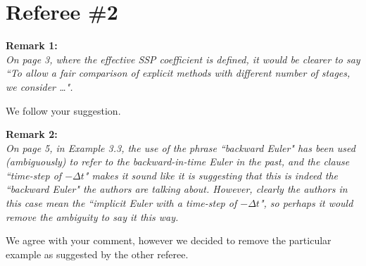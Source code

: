 \documentclass[12pt]{article}
\newcommand{\remark}[2]{\vspace{25pt} \noindent \textbf{Remark #1:\newline} \textit{#2}\vspace{15pt}}
\renewcommand{\newline}{\vspace{15pt}\\}
\begin{document}
\section*{Referee \#2}

\remark{1}{
On page 3, where the effective SSP coefficient is defined, it would be clearer to say
``To allow a fair comparison of explicit methods with different number of stages, we consider \dots". }

We follow your suggestion.

\remark{2}{
On page 5, in Example 3.3, the use of the phrase ``backward Euler" has been used 
(ambiguously) to refer to the backward-in-time Euler in the past, and the clause 
``time-step of $-\Delta t$" makes it sound like it is suggesting that this is indeed 
the ``backward Euler" the authors are talking about. 
However, clearly the authors in this case mean the ``implicit Euler with a time-step 
of $-\Delta t$", so perhaps it would remove the ambiguity to say it this way.}

We agree with your comment, however we decided to remove the particular example 
as suggested by the other referee.
\end{document}
